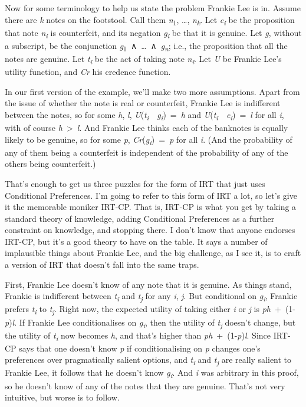\documentclass[
  12pt,
  letterpaper,
]{scrbook}
\begin{document}
Now for some terminology to help us state the problem Frankie Lee is in.
Assume there are \emph{k} notes on the footstool. Call them
\emph{n}\textsubscript{1}, \ldots, \emph{n\textsubscript{k}}. Let
\emph{c\textsubscript{i}} be the proposition that note
\emph{n\textsubscript{i}} is counterfeit, and its negation
\emph{g\textsubscript{i}} be that it is genuine. Let \emph{g}, without a
subscript, be the conjunction
\emph{g}\textsubscript{1}~∧~\ldots~∧~\emph{g\textsubscript{n}}; i.e.,
the proposition that all the notes are genuine. Let
\emph{t\textsubscript{i}} be the act of taking note
\emph{n\textsubscript{i}}. Let \emph{U} be Frankie Lee's utility
function, and \emph{Cr} his credence function.

In our first version of the example, we'll make two more assumptions.
Apart from the issue of whether the note is real or counterfeit, Frankie
Lee is indifferent between the notes, so for some \emph{h}, \emph{l},
\emph{U}(\emph{t\textsubscript{i}}~\textbar~\emph{g\textsubscript{i}})~=~\emph{h}
and
\emph{U}(\emph{t\textsubscript{i}}~\textbar~\emph{c\textsubscript{i}})~=~\emph{l}
for all \emph{i}, with of course \emph{h}~\textgreater~\emph{l}. And
Frankie Lee thinks each of the banknotes is equally likely to be
genuine, so for some \emph{p},
\emph{Cr}(\emph{g\textsubscript{i}})~=~\emph{p} for all \emph{i}. (And
the probability of any of them being a counterfeit is independent of the
probability of any of the others being counterfeit.)

That's enough to get us three puzzles for the form of IRT that just uses
Conditional Preferences. I'm going to refer to this form of IRT a lot,
so let's give it the memorable moniker IRT-CP. That is, IRT-CP is what
you get by taking a standard theory of knowledge, adding Conditional
Preferences as a further constraint on knowledge, and stopping there. I
don't know that anyone endorses IRT-CP, but it's a good theory to have
on the table. It says a number of implausible things about Frankie Lee,
and the big challenge, as I see it, is to craft a version of IRT that
doesn't fall into the same traps.

First, Frankie Lee doesn't know of any note that it is genuine. As
things stand, Frankie is indifferent between \emph{t\textsubscript{i}}
and \emph{t\textsubscript{j}} for any \emph{i}, \emph{j}. But
conditional on \emph{g\textsubscript{i}}, Frankie prefers
\emph{t\textsubscript{i}} to \emph{t\textsubscript{j}}. Right now, the
expected utility of taking either \emph{i} or \emph{j} is
\emph{ph}~+~(1-\emph{p})\emph{l}. If Frankie Lee conditionalises on
\emph{g\textsubscript{i}}, then the utility of \emph{t\textsubscript{j}}
doesn't change, but the utility of \emph{t\textsubscript{i}} now becomes
\emph{h}, and that's higher than \emph{ph}~+~(1-\emph{p})\emph{l}. Since
IRT-CP says that one doesn't know \emph{p} if conditionalising on
\emph{p} changes one's preferences over pragmatically salient options,
and \emph{t\textsubscript{i}} and \emph{t\textsubscript{j}} are really
salient to Frankie Lee, it follows that he doesn't know
\emph{g\textsubscript{i}}. And \emph{i} was arbitrary in this proof, so
he doesn't know of any of the notes that they are genuine. That's not
very intuitive, but worse is to follow.
\end{document}
